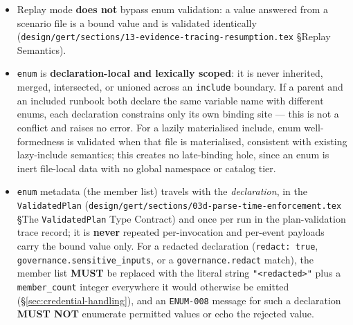 \begin{itemize}
        (single-cause reporting). \texttt{\${count}} coercing to
        \texttt{"2"} and matching a member \texttt{"2"} is a pass --- enum
        operates on the post-coercion PJVM string. On failure
        (\texttt{ENUM-008}) the binding does not occur: the value never
        enters the execution context, is never passed to a tool, and is
        never written to the trace as an accepted value; there is no
        coercion, no nearest-match auto-correction, and no fallback to
        \texttt{default}. This applies at every input-resolution site,
        including \texttt{from: prompt} (the operator is re-prompted per
        the existing collector retry contract where one applies; otherwise
        the run fails), \texttt{from: env}, \texttt{from: <provider>.<field>},
        and caller/context bindings.
  \item Replay mode \textbf{does not} bypass enum validation: a value
        answered from a scenario file is a bound value and is validated
        identically (\texttt{design/gert/sections/13-evidence-tracing-resumption.tex}
        \S Replay Semantics).
  \item \texttt{enum} is \textbf{declaration-local and lexically scoped}: it
        is never inherited, merged, intersected, or unioned across an
        \texttt{include} boundary. If a parent and an included runbook both
        declare the same variable name with different enums, each
        declaration constrains only its own binding site --- this is not a
        conflict and raises no error. For a lazily materialised include,
        enum well-formedness is validated when that file is materialised,
        consistent with existing lazy-include semantics; this creates no
        late-binding hole, since an enum is inert file-local data with no
        global namespace or catalog tier.
  \item \texttt{enum} metadata (the member list) travels with the
        \emph{declaration}, in the \texttt{ValidatedPlan}
        (\texttt{design/gert/sections/03d-parse-time-enforcement.tex}
        \S The \texttt{ValidatedPlan} Type Contract) and once per run in the
        plan-validation trace record; it is \textbf{never} repeated
        per-invocation and per-event payloads carry the bound value only.
        For a redacted declaration (\texttt{redact: true},
        \texttt{governance.sensitive\_inputs}, or a
        \texttt{governance.redact} match), the member list \textbf{MUST}
        be replaced with the literal string \texttt{"<redacted>"} plus a
        \texttt{member\_count} integer everywhere it would otherwise be
        emitted (\S\ref{sec:credential-handling}), and an
        \texttt{ENUM-008} message for such a declaration \textbf{MUST NOT}
        enumerate permitted values or echo the rejected value.
\end{itemize}

